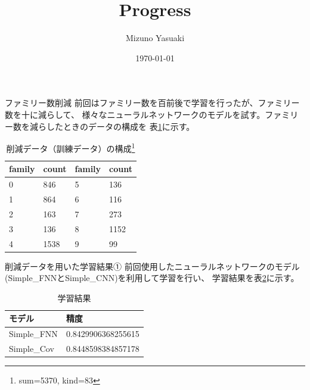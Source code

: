 \documentclass[dvipdfmx]{beamer}
\title{Progress}
\date{\today}
\author{Mizuno Yasuaki}
\begin{document}
  \maketitle
  
  \begin{frame}{ファミリー数削減}
    前回はファミリー数を百前後で学習を行ったが、ファミリー数を十に減らして、
    様々なニューラルネットワークのモデルを試す。ファミリー数を減らしたときのデータの構成を
    表\ref{tab:composition}に示す。
    \begin{table}
      \caption{削減データ（訓練データ）の構成\footnote{sum=5370, kind=83}}
      \label{tab:composition}
      \centering  
      \begin{tabular}{llll}
        \hline
        family & count & family & count \\
        \hline \hline
        0 & 846 & 5 & 136 \\
        1 & 864 & 6 & 116 \\
        2 & 163 & 7 & 273 \\
        3 & 136 & 8 & 1152 \\
        4 & 1538 & 9 & 99 \\
        \hline
      \end{tabular}
    \end{table}
  \end{frame}

  \begin{frame}{削減データを用いた学習結果①}
    前回使用したニューラルネットワークのモデル(Simple\_FNNとSimple\_CNN)を利用して学習を行い、
    学習結果を表\ref{tab:train_result}に示す。
    \begin{table}
      \caption{学習結果}
      \label{tab:train_result}
      \centering
      \begin{tabular}{ll}
        \hline
        モデル & 精度 \\
        \hline \hline
        Simple\_FNN & 0.8429906368255615 \\
        Simple\_Cov & 0.8448598384857178 \\
        \hline
      \end{tabular}
    \end{table}
  \end{frame}
\end{document}
